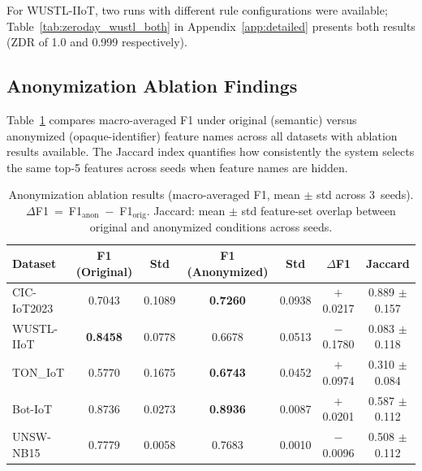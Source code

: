 For WUSTL-IIoT, two runs with different rule configurations were available;
Table~\ref{tab:zeroday_wustl_both} in Appendix~\ref{app:detailed} presents
both results (ZDR of 1.0 and 0.999 respectively).

\subsection{Anonymization Ablation Findings}\label{subsec:anon_results}

Table~\ref{tab:anon_ablation} compares macro-averaged F1 under original
(semantic) versus anonymized (opaque-identifier) feature names across all
datasets with ablation results available. The Jaccard index quantifies
how consistently the system selects the same top-5 features across seeds when
feature names are hidden.

\begin{table}[htbp]
\centering
\caption{Anonymization ablation results (macro-averaged F1, mean $\pm$ std
  across 3~seeds). $\Delta$F1~=~F1$_{\text{anon}}$~$-$~F1$_{\text{orig}}$.
  Jaccard: mean $\pm$ std feature-set overlap between original and anonymized
  conditions across seeds.}
\label{tab:anon_ablation}
\begin{tabular}{lcccccc}
\toprule
\textbf{Dataset} &
  \textbf{F1 (Original)} & \textbf{Std} &
  \textbf{F1 (Anonymized)} & \textbf{Std} &
  \textbf{$\Delta$F1} & \textbf{Jaccard} \\
\midrule
CIC-IoT2023 & 0.7043 & 0.1089 & \textbf{0.7260} & 0.0938 & $+$0.0217 & 0.889 $\pm$ 0.157 \\
WUSTL-IIoT  & \textbf{0.8458} & 0.0778 & 0.6678 & 0.0513 & $-$0.1780 & 0.083 $\pm$ 0.118 \\
TON\_IoT    & 0.5770 & 0.1675 & \textbf{0.6743} & 0.0452 & $+$0.0974 & 0.310 $\pm$ 0.084 \\
Bot-IoT     & 0.8736 & 0.0273 & \textbf{0.8936} & 0.0087 & $+$0.0201 & 0.587 $\pm$ 0.112 \\
UNSW-NB15   & 0.7779 & 0.0058 & 0.7683 & 0.0010 & $-$0.0096 & 0.508 $\pm$ 0.112 \\
\bottomrule
\end{tabular}
\end{table}

